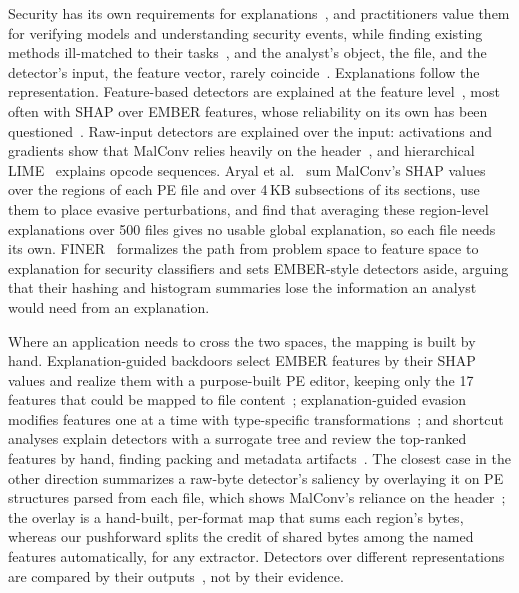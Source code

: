 Security has its own requirements for explanations~\cite{guo2018lemna, warnecke2020evaluating, nadeem2023sok}, and
practitioners value them for verifying models and understanding security events, while finding existing methods
ill-matched to their tasks~\cite{mink2023everybody}, and the analyst's object, the file, and the detector's input, the
feature vector, rarely coincide~\cite{rui2024position}. Explanations follow the representation. Feature-based detectors
are explained at the feature level~\cite{melis2018explaining, fan2020can, wu2021android, zhu2024dynamic}, most often
with SHAP over EMBER features, whose reliability on its own has been questioned~\cite{mohseni2026shap}. Raw-input
detectors are explained over the input: activations and gradients show that MalConv relies heavily on the
header~\cite{coull2019activation, bose2020explaining, demetrio2019explaining}, and hierarchical
LIME~\cite{mitchell2024generating} explains opcode sequences. Aryal et al.~\cite{aryal2024explainability} sum MalConv's
SHAP values over the regions of each PE file and over 4\,KB subsections of its sections, use them to place evasive
perturbations, and find that averaging these region-level explanations over 500 files gives no usable global
explanation, so each file needs its own. FINER~\cite{he2023finer} formalizes the path from problem space to feature
space to explanation for security classifiers and sets EMBER-style detectors aside, arguing that their hashing and
histogram summaries lose the information an analyst would need from an explanation.

Where an application needs to cross the two spaces, the mapping is built by hand. Explanation-guided backdoors select
EMBER features by their SHAP values and realize them with a purpose-built PE editor, keeping only the 17 features that
could be mapped to file content~\cite{severi2021explanation}; explanation-guided evasion modifies features one at a time
with type-specific transformations~\cite{rosenberg2020generating}; and shortcut analyses explain detectors with a surrogate tree and review the top-ranked features by hand, finding
packing and metadata artifacts~\cite{mohammed2026beyond}. The
closest case in the other direction summarizes a raw-byte detector's saliency by overlaying it on PE structures parsed
from each file, which shows MalConv's reliance on the header~\cite{coull2019activation, bose2020explaining}; the
overlay is a hand-built, per-format map that sums each region's bytes, whereas our pushforward splits the credit of
shared bytes among the named features automatically, for any extractor. Detectors over different representations are
compared by their outputs~\cite{quiring2020against, salman2024robustness}, not by their evidence.

